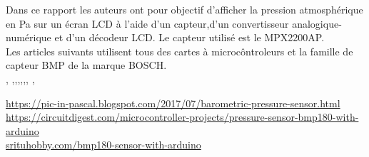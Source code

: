 \documentclass[a4paper,12pt]{report}
\begin{document}
\renewcommand{\bibname}{Bibliographie et Webographie}




\pagebreak

\pagestyle{empty}

Dans ce rapport \cite{barometer} les auteurs ont pour objectif d'afficher la pression atmosphérique en Pa sur un écran LCD à l'aide d'un capteur,d'un convertisseur analogique-numérique et d'un décodeur LCD. Le capteur utilisé est le MPX2200AP.\\

Les articles suivants utilisent tous des cartes à microcôntroleurs et la famille de capteur BMP de la marque BOSCH.\\


\cite{2}, \cite{3},\cite{4},\cite{5},\cite{6},\cite{7},\cite{8}, \cite{9}, \cite{10}








\url{https://pic-in-pascal.blogspot.com/2017/07/barometric-pressure-sensor.html}\\[1cm]
\url{https://circuitdigest.com/microcontroller-projects/pressure-sensor-bmp180-with-arduino}\\[1cm]
\url{srituhobby.com/bmp180-sensor-with-arduino}\\[1cm]




 




\pagestyle{empty}
\end{document}
